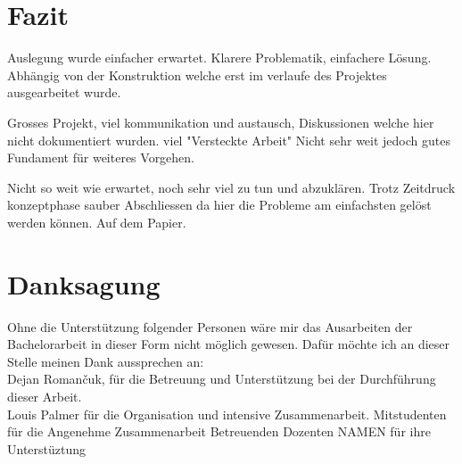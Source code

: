 \newpage

\section{Fazit}
Auslegung wurde einfacher erwartet. Klarere Problematik, einfachere Lösung.
Abhängig von der Konstruktion welche erst im verlaufe des Projektes ausgearbeitet wurde.

Grosses Projekt, viel kommunikation und austausch, Diskussionen welche hier nicht dokumentiert wurden. viel "Versteckte Arbeit"
Nicht sehr weit jedoch gutes Fundament für weiteres Vorgehen.

Nicht so weit wie erwartet, noch sehr viel zu tun und abzuklären.
Trotz Zeitdruck konzeptphase sauber Abschliessen da hier die Probleme am einfachsten gelöst werden können. Auf dem Papier.



\newpage

\section{Danksagung}
Ohne die Unterstützung folgender Personen wäre mir das Ausarbeiten der Bachelorarbeit in dieser Form nicht möglich gewesen. Dafür möchte ich an dieser Stelle meinen Dank aussprechen an:\\
Dejan Roman\v{c}uk, für die Betreuung und Unterstützung bei der Durchführung dieser Arbeit.\\
Louis Palmer für die Organisation und intensive Zusammenarbeit.
Mitstudenten für die Angenehme Zusammenarbeit
Betreuenden Dozenten NAMEN für ihre Unterstüztung
\newpage
